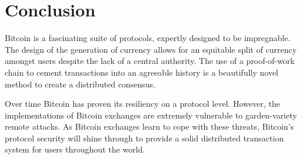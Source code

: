 \documentclass{report}
\begin{document}
\section*{Conclusion}
Bitcoin is a fascinating suite of protocols, expertly designed to be
impregnable. The design of the generation of currency allows for an equitable
split of currency amongst users despite the lack of a central authority. The
use of a proof-of-work chain to cement transactions into an agreeable history is
a beautifully novel method to create a distributed consensus.

Over time Bitcoin has proven its resiliency on a protocol level. However, the
implementations of Bitcoin exchanges are extremely vulnerable to garden-variety
remote attacks. As Bitcoin exchanges learn to cope with these threats, Bitcoin's
protocol security will shine through to provide a solid distributed transaction
system for users throughout the world.

{}

\end{document}

